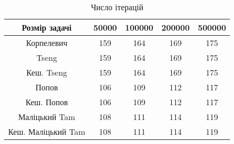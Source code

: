 \begin{table}[H]
	\centering
	\begin{tabular}{|c||c|c|c|c|}\hline
		Розмір задачі & 50000 & 100000 & 200000 & 500000 \\ \hline \hline
		Корпелевич & 159 & 164 & 169 & 175 \\ \hline
		Tseng & 159 & 164 & 169 & 175 \\ \hline
		Кеш. Tseng & 159 & 164 & 169 & 175 \\ \hline
		Попов & 106 & 109 & 112 & 117 \\ \hline
		Кеш. Попов & 106 & 109 & 112 & 117 \\ \hline
		Маліцький Tam & 108 & 111 & 114 & 119 \\ \hline
		Кеш. Маліцький Tam & 108 & 111 & 114 & 119 \\ \hline
	\end{tabular}
	\caption{Число ітерацій}
\end{table}
